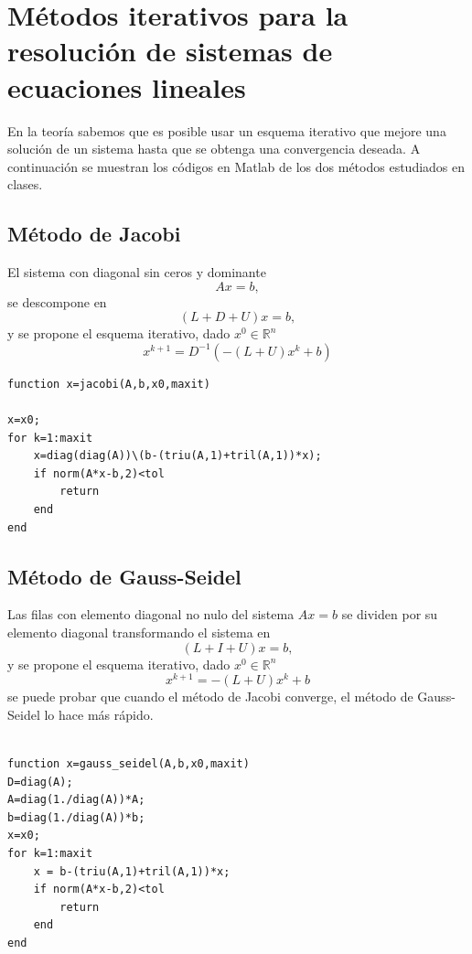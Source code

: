 \documentclass[11pt]{article}
\begin{document}
\section{M\'etodos iterativos para la resoluci\'on de sistemas de ecuaciones lineales}                                                         
En la teor\'ia sabemos que es posible usar un esquema iterativo que mejore una soluci\'on de un sistema hasta que se obtenga una convergencia deseada. A continuaci\'on se muestran los c\'odigos en Matlab de los dos m\'etodos estudiados en clases.
\subsection{M\'etodo de Jacobi}
El sistema con diagonal sin ceros y dominante
$$
Ax=b,
$$
se descompone en 
$$
(L+D+U)x=b,
$$
y se propone el esquema iterativo, dado $x^0\in\mathbb{R}^n$
$$
x^{k+1}=D^{-1}(-(L+U)x^k+b)
$$
\begin{verbatim}
function x=jacobi(A,b,x0,maxit)

x=x0;
for k=1:maxit
    x=diag(diag(A))\(b-(triu(A,1)+tril(A,1))*x);
    if norm(A*x-b,2)<tol
        return
    end
end
\end{verbatim}

\subsection{M\'etodo de Gauss-Seidel}
Las filas con elemento diagonal no nulo del sistema  $Ax=b$ se dividen por su elemento diagonal transformando el sistema en
$$
(L+I+U)x=b,
$$
y se propone el esquema iterativo, dado $x^0\in\mathbb{R}^n$
$$
x^{k+1}=-(L+U)x^k+b
$$
se puede probar que cuando el m\'etodo de Jacobi converge, el m\'etodo de Gauss-Seidel lo hace m\'as r\'apido.
\begin{verbatim}

function x=gauss_seidel(A,b,x0,maxit)
D=diag(A);
A=diag(1./diag(A))*A;
b=diag(1./diag(A))*b;
x=x0;
for k=1:maxit
    x = b-(triu(A,1)+tril(A,1))*x;
    if norm(A*x-b,2)<tol
        return
    end
end
\end{verbatim}
\end{document}
